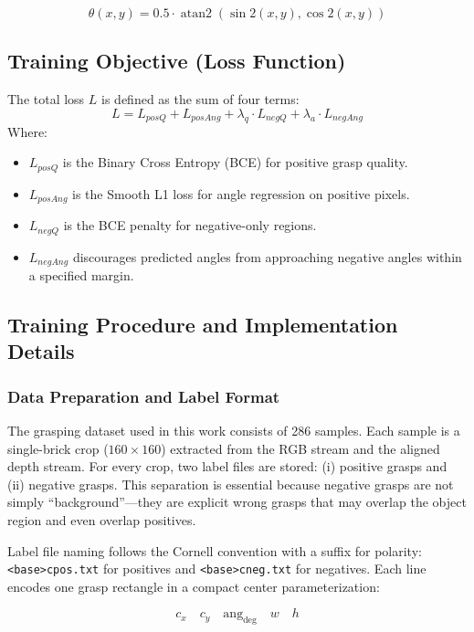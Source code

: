 \begin{equation}
    \theta(x, y) = 0.5 \cdot \operatorname{atan2}(\sin 2(x, y), \cos 2(x, y))
\end{equation}


\subsection{Training Objective (Loss Function)}
The total loss $L$ is defined as the sum of four terms:
$$L = L_{posQ} + L_{posAng} + \lambda_q \cdot L_{negQ} + \lambda_a \cdot L_{negAng}$$
Where:
\begin{itemize}
    \item $L_{posQ}$ is the Binary Cross Entropy (BCE) for positive grasp quality.
    \item $L_{posAng}$ is the Smooth L1 loss for angle regression on positive pixels.
    \item $L_{negQ}$ is the BCE penalty for negative-only regions.
    \item $L_{negAng}$ discourages predicted angles from approaching negative angles within a specified margin.
\end{itemize}

\subsection{Training Procedure and Implementation Details}

\subsubsection{Data Preparation and Label Format}
The grasping dataset used in this work consists of 286 samples. Each sample is a single-brick crop ($160 \times 160$) extracted from the RGB stream and the aligned depth stream. For every crop, two label files are stored: (i) positive grasps and (ii) negative grasps. This separation is essential because negative grasps are not simply ``background''---they are explicit wrong grasps that may overlap the object region and even overlap positives.

Label file naming follows the Cornell convention with a suffix for polarity: \texttt{<base>cpos.txt} for positives and \texttt{<base>cneg.txt} for negatives. Each line encodes one grasp rectangle in a compact center parameterization:

\begin{equation*}
    c_x \quad c_y \quad \text{ang}_{\text{deg}} \quad w \quad h
\end{equation*}

